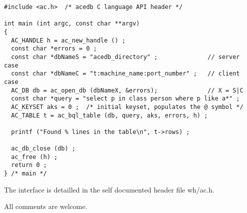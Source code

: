\documentclass[11pt]{article}
\newcommand{\BL}{\begin{lstlisting}}
\begin{document}
\BL
#include <ac.h>  /* acedb C language API header */

int main (int argc, const char **argv)
{
  AC_HANDLE h = ac_new_handle () ;
  const char *errors = 0 ;
  const char *dbNameS = "acedb_directory" ;              // server case
  const char *dbNameC = "t:machine_name:port_number" ;   // client case
  AC_DB db = ac_open_db (dbNameX, &errors);              // X = S|C
  const char *query = "select p in class person where p like a*" ;
  AC_KEYSET aks = 0 ;  /* initial keyset, populates the @ symbol */
  AC_TABLE t = ac_bql_table (db, query, aks, errors, h) ;

  printf ("Found % lines in the table\n", t->rows) ;

  ac_db_close (db) ;
  ac_free (h) ;
  return 0 ;
} /* main */

\end{lstlisting}
The interface is detailled in the self documented header file wh/ac.h.

All comments are welcome.



\end{document}
